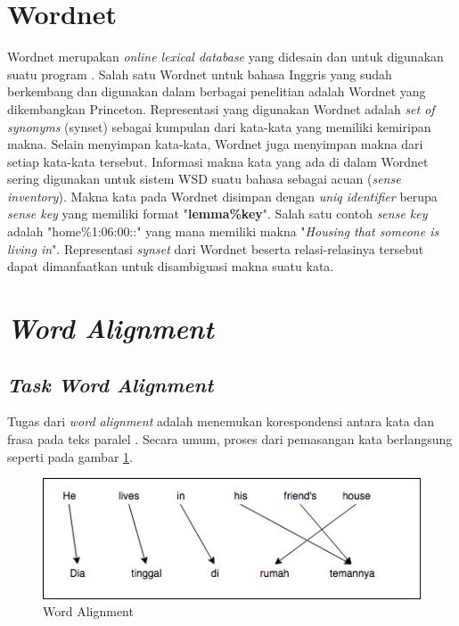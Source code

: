 
\section{Wordnet}

Wordnet merupakan \textit{online lexical database} yang didesain dan untuk digunakan suatu program \citep{miller1995wordnet}. Salah satu Wordnet untuk bahasa Inggris yang sudah berkembang dan digunakan dalam berbagai penelitian adalah Wordnet yang dikembangkan Princeton. Representasi yang digunakan Wordnet adalah \textit{set of synonyms} (synset) sebagai kumpulan dari kata-kata yang memiliki kemiripan makna. Selain menyimpan kata-kata, Wordnet juga menyimpan makna dari setiap kata-kata tersebut. Informasi makna kata yang ada di dalam Wordnet sering digunakan untuk sistem WSD suatu bahasa sebagai acuan (\textit{sense inventory}). Makna kata pada Wordnet disimpan dengan \textit{uniq identifier} berupa \textit{sense key} yang memiliki format "\textbf{lemma\%key}". Salah satu contoh \textit{sense key} adalah "home\%1:06:00::" yang mana memiliki makna "\textit{Housing that someone is living in}". Representasi \textit{synset} dari Wordnet beserta relasi-relasinya tersebut dapat dimanfaatkan untuk disambiguasi makna suatu kata.
\section{\textit{Word Alignment}}

\subsection{\textit{Task Word Alignment}}
Tugas dari \textit{word alignment} adalah menemukan korespondensi antara kata dan frasa pada teks paralel 
\citep{mihalcea2003evaluation}. Secara umum, proses dari pemasangan kata berlangsung seperti pada gambar \ref{fig:word-alignment}.


\begin{figure}
	\centering
	\includegraphics[width=1\linewidth]{adit_pics/wordalignment.jpeg}
	\caption{Word Alignment}
	\label{fig:word-alignment}
\end{figure}

